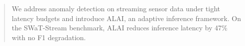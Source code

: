 \begin{abstract}
We address anomaly detection on streaming sensor data under tight latency
budgets and introduce ALAI, an adaptive inference framework. On the SWaT-Stream
benchmark, ALAI reduces inference latency by 47\% with no F1 degradation.
\end{abstract}
